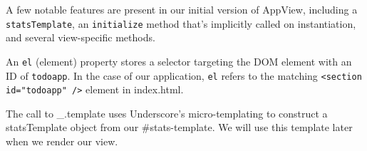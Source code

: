 \documentclass[9pt]{book}
\newenvironment{Shaded}{}{}
\newcommand{\KeywordTok}[1]{\textcolor[rgb]{0.00,0.44,0.13}{\textbf{{#1}}}}
\newcommand{\DataTypeTok}[1]{\textcolor[rgb]{0.56,0.13,0.00}{{#1}}}
\newcommand{\StringTok}[1]{\textcolor[rgb]{0.25,0.44,0.63}{{#1}}}
\newcommand{\CommentTok}[1]{\textcolor[rgb]{0.38,0.63,0.69}{\textit{{#1}}}}
\newcommand{\OtherTok}[1]{\textcolor[rgb]{0.00,0.44,0.13}{{#1}}}
\newcommand{\FunctionTok}[1]{\textcolor[rgb]{0.02,0.16,0.49}{{#1}}}
\newcommand{\NormalTok}[1]{{#1}}
\begin{document}
\begin{Shaded}
\end{Shaded}

A few notable features are present in our initial version of AppView,
including a \texttt{statsTemplate}, an \texttt{initialize} method that's
implicitly called on instantiation, and several view-specific methods.

An \texttt{el} (element) property stores a selector targeting the DOM
element with an ID of \texttt{todoapp}. In the case of our application,
\texttt{el} refers to the matching
\texttt{\textless{}section id="todoapp" /\textgreater{}} element in
index.html.

The call to \_.template uses Underscore's micro-templating to construct
a statsTemplate object from our \#stats-template. We will use this
template later when we render our view.
\end{document}
